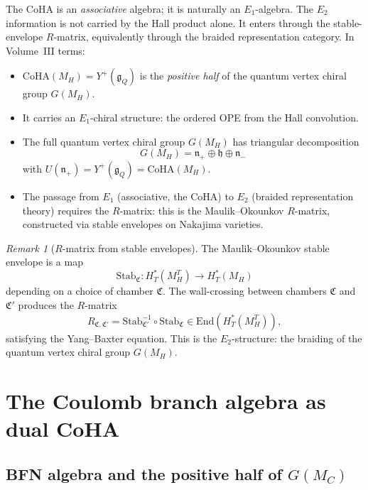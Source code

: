 \documentclass[11pt]{article}
\theoremstyle{definition}
\theoremstyle{remark}
\newtheorem{remark}[theorem]{Remark}
\newcommand{\End}{\mathrm{End}}
\newcommand{\Eone}{E_1}
\newcommand{\Etwo}{E_2}
\newcommand{\frakg}{\mathfrak{g}}
\newcommand{\frakn}{\mathfrak{n}}
\newcommand{\CoHA}{\mathrm{CoHA}}
\begin{document}
The CoHA is an \emph{associative} algebra; it is naturally an $\Eone$-algebra. The $\Etwo$ information is not carried by the Hall product alone. It enters through the stable-envelope $R$-matrix, equivalently through the braided representation category. In Volume~III terms:
\begin{itemize}
 \item $\CoHA(M_H) = Y^+(\frakg_Q)$ is the \emph{positive half} of the quantum vertex chiral group $G(M_H)$.
 \item It carries an $\Eone$-chiral structure: the ordered OPE from the Hall convolution.
 \item The full quantum vertex chiral group $G(M_H)$ has triangular decomposition
 \[
 G(M_H) = \frakn_+ \oplus \mathfrak{h} \oplus \frakn_-
 \]
 with $U(\frakn_+) = Y^+(\frakg_Q) = \CoHA(M_H)$.
 \item The passage from $\Eone$ (associative, the CoHA) to $\Etwo$ (braided representation theory) requires the $R$-matrix: this is the Maulik--Okounkov $R$-matrix, constructed via stable envelopes on Nakajima varieties.
\end{itemize}

\begin{remark}[$R$-matrix from stable envelopes]
\label{rem:stable-envelopes}
The Maulik--Okounkov stable envelope is a map
\[
 \mathrm{Stab}_{\mathfrak{C}} \colon H^*_T(M_H^T) \to H^*_T(M_H)
\]
depending on a choice of chamber $\mathfrak{C}$. The wall-crossing between chambers $\mathfrak{C}$ and $\mathfrak{C}'$ produces the $R$-matrix
\[
 R_{\mathfrak{C}, \mathfrak{C}'} = \mathrm{Stab}_{\mathfrak{C}'}^{-1} \circ \mathrm{Stab}_{\mathfrak{C}} \in \End(H^*_T(M_H^T)),
\]
satisfying the Yang--Baxter equation. This is the $\Etwo$-structure: the braiding of the quantum vertex chiral group $G(M_H)$.
\end{remark}

\section{The Coulomb branch algebra as dual CoHA}
\label{sec:coulomb-dual-coha}

\subsection{BFN algebra and the positive half of $G(M_C)$}
\end{document}
